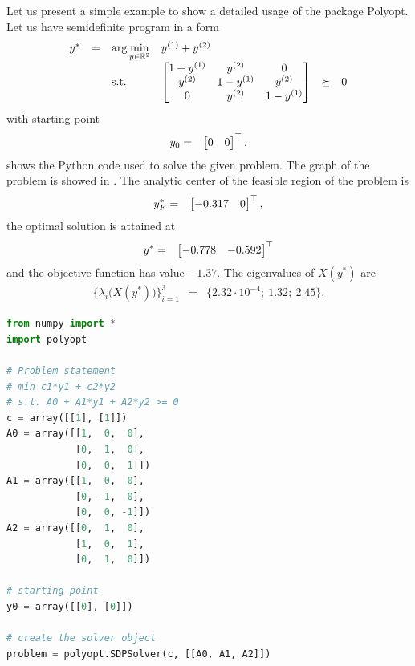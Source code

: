 \begin{example}
  Let us present a simple example to show a detailed usage of the package Polyopt.
  Let us have semidefinite program in a form
  \begin{eqnarray}
    \begin{array}{rclrrclcll}
      y^* &=& \displaystyle \arg\min_{y\in\R^2} & \multicolumn{3}{l}{y\ind1 + y\ind2} \\
      && \text{s.t.} & \displaystyle \bmB 1 +y\ind1 & y\ind2 & 0\\ y\ind2 & 1 -y\ind1& y\ind2\\ 0 & y\ind2 & 1-y\ind1 \bmE &\succeq& 0
    \end{array}
    \end{eqnarray}
  with starting point
  \begin{eqnarray}
    y_0 &=& \begin{bmatrix} 0 & 0\end{bmatrix}^\top.
  \end{eqnarray}
   shows the Python code used to solve the given problem.
  The graph of the problem is showed in .
  The analytic center of the feasible region of the problem is
  \begin{eqnarray}
    y_F^* &=& \begin{bmatrix} -0.317 & 0\end{bmatrix}^\top,
  \end{eqnarray}
  the optimal solution is attained at
  \begin{eqnarray}
    y^* &=& \begin{bmatrix} -0.778 & -0.592 \end{bmatrix}^\top
  \end{eqnarray}
  and the objective function has value $-1.37$.
  The eigenvalues of $X(y^*)$ are
  \begin{eqnarray}
    \Big\{\lambda_i\big(X(y^*)\big)\Big\}_{i=1}^3 &=& \{2.32\cdot10^{-4};\ 1.32;\ 2.45\}.
  \end{eqnarray}

  \begin{lstlisting}[float, language=python, caption={Code for solving semidefinite problem stated in \refex{SDP:imp:demo}.}, labellis={SDP:imp:demo}]
from numpy import *
import polyopt

# Problem statement
# min c1*y1 + c2*y2
# s.t. A0 + A1*y1 + A2*y2 >= 0
c = array([[1], [1]])
A0 = array([[1,  0,  0],
            [0,  1,  0],
            [0,  0,  1]])
A1 = array([[1,  0,  0],
            [0, -1,  0],
            [0,  0, -1]])
A2 = array([[0,  1,  0],
            [1,  0,  1],
            [0,  1,  0]])

# starting point 
y0 = array([[0], [0]])

# create the solver object
problem = polyopt.SDPSolver(c, [[A0, A1, A2]])


\end{lstlisting}
\end{example}
